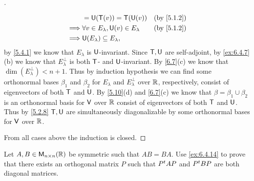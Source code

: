 \begin{proof}[]
\begin{itemize}
\begin{align*}
			               & = \U(\T(v)) = \T(\U(v))                                  &  & \by{5.1.2}    \\
			      \implies & \forall v \in E_{\lambda}, \U(v) \in E_{\lambda}         &  & \by{5.1.2}    \\
			      \implies & \U(E_{\lambda}) \subseteq E_{\lambda},
		      \end{align*}
		      by \cref{5.4.1} we know that \(E_{\lambda}\) is \(\mathsf{U}\)-invariant.
		      Since \(\mathsf{T}, \mathsf{U}\) are self-adjoint, by \cref{ex:6.4.7}(b) we know that \(E_{\lambda}^{\perp}\) is both \(\mathsf{T}\)- and \(\mathsf{U}\)-invariant.
		      By \cref{6.7}(c) we know that \(\dim(E_{\lambda}^{\perp}) < n + 1\).
		      Thus by induction hypothesis we can find some orthonormal bases \(\beta_1\) and \(\beta_2\) for \(E_{\lambda}\) and \(E_{\lambda}^{\perp}\) over \(\mathbb{R}\), respectively, consist of eigenvectors of both \(\mathsf{T}\) and \(\mathsf{U}\).
		      By \cref{5.10}(d) and \cref{6.7}(c) we know that \(\beta = \beta_1 \cup \beta_2\) is an orthonormal basis for \(\mathsf{V}\) over \(\mathbb{R}\) consist of eigenvectors of both \(\mathsf{T}\) and \(\mathsf{U}\).
		      Thus by \cref{5.2.8} \(\mathsf{T}, \mathsf{U}\) are simultaneously diagonalizable by some orthonormal bases for \(\mathsf{V}\) over \(\mathbb{R}\).
	\end{itemize}
	From all cases above the induction is closed.
\end{proof}

\begin{ex}\label{ex:6.4.15}
	Let \(A, B \in \ms[n][n][\R]\) be symmetric such that \(AB = BA\).
	Use \cref{ex:6.4.14} to prove that there exists an orthogonal matrix \(P\) such that \({P}^{t} A P\) and \({P}^{t} B P\) are both diagonal matrices.
\end{ex}

